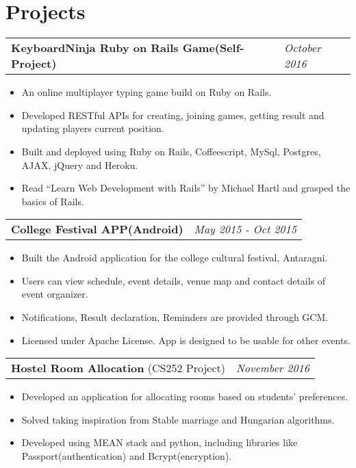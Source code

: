 \documentclass{article}
\begin{document}
\section{Projects}
\begin{tabularx}{\textwidth}{Xl}
		  \textbf{KeyboardNinja Ruby on Rails Game(Self-Project)}
		  & \textit{October 2016}
		  \end{tabularx}
		  \begin{itemize}
		\vspace{-2mm} \setlength\itemsep{-0.5em}
		\item An online multiplayer typing game build on Ruby on Rails.
		\item Developed RESTful APIs for creating, joining games, getting result and updating players current position.
		\item Built and deployed using Ruby on Rails, Coffeescript, MySql, Postgres, AJAX, jQuery and Heroku.
		\item Read ``Learn Web Development with Rails'' by Michael Hartl and grasped the basics of Rails.
		  \end{itemize}
\begin{tabularx}{\textwidth}{Xl}
		  \textbf{College Festival APP(Android)}
		 & \textit{May 2015 - Oct 2015}
		  \end{tabularx}
		  \begin{itemize}
			\vspace{-2mm} \setlength\itemsep{-0.5em}
			\item Built the Android application for the college cultural festival, Antaragni.
			\item Users can view schedule, event details, venue map and contact details of event organizer.
			\item Notifications, Result declaration, Reminders are provided through GCM.
			\item Licensed under Apache License. App is designed to be usable for other events.
		  \end{itemize}
\begin{tabularx}{\textwidth}{Xl}
	 \textbf{Hostel Room Allocation} (CS252 Project)
	 & \textit{November 2016}
	 \end{tabularx}
\begin{itemize}
\vspace{-2mm} \setlength\itemsep{-0.5em}
\item Developed an application for allocating rooms based on students' preferences.
\item Solved taking inspiration from Stable marriage and Hungarian algorithms.
\item Developed using MEAN stack and python, including libraries like Passport(authentication) and Bcrypt(encryption).
\end{itemize}
\end{document}
